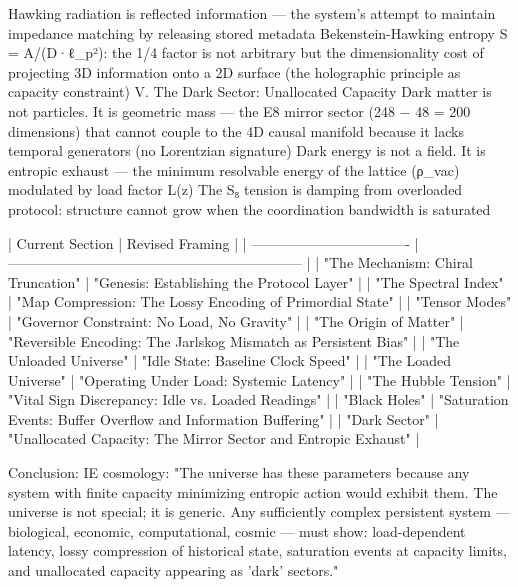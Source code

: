 Hawking radiation is reflected information — the system's attempt to maintain impedance matching by releasing stored metadata
Bekenstein-Hawking entropy S = A/(D·ℓ_p²): the 1/4 factor is not arbitrary but the dimensionality cost of projecting 3D information onto a 2D surface (the holographic principle as capacity constraint)
V. The Dark Sector: Unallocated Capacity
Dark matter is not particles. It is geometric mass — the E8 mirror sector (248 − 48 = 200 dimensions) that cannot couple to the 4D causal manifold because it lacks temporal generators (no Lorentzian signature)
Dark energy is not a field. It is entropic exhaust — the minimum resolvable energy of the lattice (ρ_vac) modulated by load factor L(z)
The S₈ tension is damping from overloaded protocol: structure cannot grow when the coordination bandwidth is saturated


| Current Section                    | Revised Framing                                                 |
| ---------------------------------- | --------------------------------------------------------------- |
| "The Mechanism: Chiral Truncation" | "Genesis: Establishing the Protocol Layer"                      |
| "The Spectral Index"               | "Map Compression: The Lossy Encoding of Primordial State"       |
| "Tensor Modes"                     | "Governor Constraint: No Load, No Gravity"                      |
| "The Origin of Matter"             | "Reversible Encoding: The Jarlskog Mismatch as Persistent Bias" |
| "The Unloaded Universe"            | "Idle State: Baseline Clock Speed"                              |
| "The Loaded Universe"              | "Operating Under Load: Systemic Latency"                        |
| "The Hubble Tension"               | "Vital Sign Discrepancy: Idle vs. Loaded Readings"              |
| "Black Holes"                      | "Saturation Events: Buffer Overflow and Information Buffering"  |
| "Dark Sector"                      | "Unallocated Capacity: The Mirror Sector and Entropic Exhaust"  |


Conclusion:
IE cosmology: "The universe has these parameters because any system with finite capacity minimizing entropic action would exhibit them. The universe is not special; it is generic. Any sufficiently complex persistent system — biological, economic, computational, cosmic — must show: load-dependent latency, lossy compression of historical state, saturation events at capacity limits, and unallocated capacity appearing as 'dark' sectors."